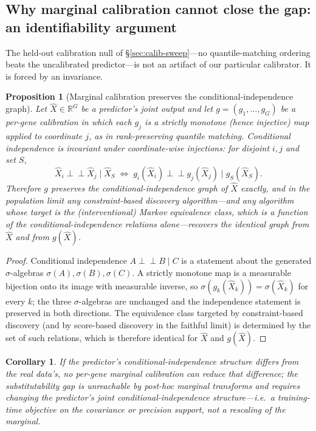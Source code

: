 \documentclass{article}
\theoremstyle{plain}
\newtheorem{proposition}[theorem]{Proposition}
\newtheorem{corollary}[theorem]{Corollary}
\theoremstyle{definition}
\theoremstyle{remark}
\begin{document}
\subsection{Why marginal calibration cannot close the gap: an identifiability argument}
\label{sec:identifiability}
The held-out calibration null of \S\ref{sec:calib-sweep}---no quantile-matching ordering beats the uncalibrated predictor---is not an artifact of our particular calibrator. It is forced by an invariance.

\begin{proposition}[Marginal calibration preserves the conditional-independence graph]
\label{prop:ci-invariance}
Let $\hat X \in \mathbb{R}^{G}$ be a predictor's joint output and let $g=(g_1,\dots,g_G)$ be a per-gene calibration in which each $g_j$ is a strictly monotone (hence injective) map applied to coordinate $j$, as in rank-preserving quantile matching. Conditional independence is invariant under coordinate-wise injections: for disjoint $i,j$ and set $S$,
\[
\hat X_i \perp\!\!\!\perp \hat X_j \mid \hat X_S \;\iff\; g_i(\hat X_i) \perp\!\!\!\perp g_j(\hat X_j) \mid g_S(\hat X_S).
\]
Therefore $g$ preserves the conditional-independence graph of $\hat X$ exactly, and in the population limit any constraint-based discovery algorithm---and any algorithm whose target is the (interventional) Markov equivalence class, which is a function of the conditional-independence relations alone---recovers the identical graph from $\hat X$ and from $g(\hat X)$.
\end{proposition}

\begin{proof}
Conditional independence $A\perp\!\!\!\perp B\mid C$ is a statement about the generated $\sigma$-algebras $\sigma(A),\sigma(B),\sigma(C)$. A strictly monotone map is a measurable bijection onto its image with measurable inverse, so $\sigma(g_k(\hat X_k))=\sigma(\hat X_k)$ for every $k$; the three $\sigma$-algebras are unchanged and the independence statement is preserved in both directions. The equivalence class targeted by constraint-based discovery (and by score-based discovery in the faithful limit) is determined by the set of such relations, which is therefore identical for $\hat X$ and $g(\hat X)$.
\end{proof}

\begin{corollary}
\label{cor:calib-kernel}
If the predictor's conditional-independence structure differs from the real data's, no per-gene marginal calibration can reduce that difference; the substitutability gap is unreachable by post-hoc marginal transforms and requires changing the predictor's joint conditional-independence structure---i.e.\ a training-time objective on the covariance or precision support, not a rescaling of the marginal.
\end{corollary}
\end{document}
